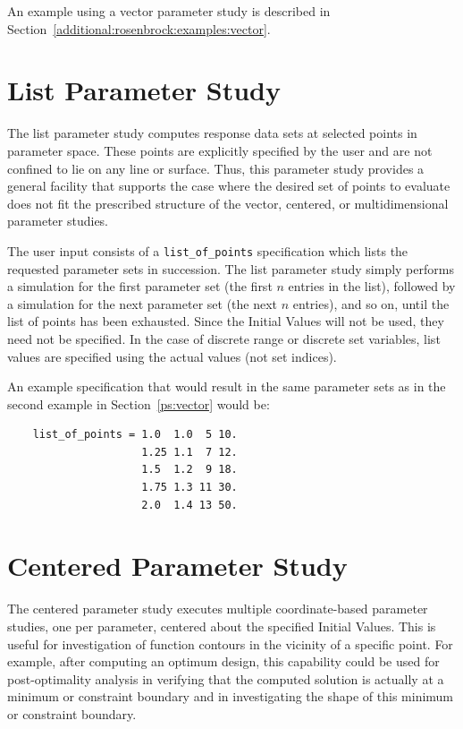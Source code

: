 An example using a vector parameter study is described in 
Section~\ref{additional:rosenbrock:examples:vector}.

\section{List Parameter Study}\label{ps:list}

The list parameter study computes response data sets at selected
points in parameter space. These points are explicitly specified by
the user and are not confined to lie on any line or surface. Thus,
this parameter study provides a general facility that supports the
case where the desired set of points to evaluate does not fit the
prescribed structure of the vector, centered, or multidimensional
parameter studies.

The user input consists of a \texttt{list\_of\_points} specification
which lists the requested parameter sets in succession. The list
parameter study simply performs a simulation for the first parameter
set (the first $n$ entries in the list), followed by a simulation for
the next parameter set (the next $n$ entries), and so on, until the
list of points has been exhausted. Since the Initial Values will not
be used, they need not be specified.  In the case of discrete range or
discrete set variables, list values are specified using the actual
values (not set indices).

An example specification that would result in the same parameter sets
as in the second example in Section~\ref{ps:vector} would be:
\begin{small}
\begin{verbatim}
    list_of_points = 1.0  1.0  5 10.
                     1.25 1.1  7 12.
                     1.5  1.2  9 18.
                     1.75 1.3 11 30.
                     2.0  1.4 13 50.
\end{verbatim}
\end{small}

\section{Centered Parameter Study}\label{ps:centered}

The centered parameter study executes multiple coordinate-based
parameter studies, one per parameter, centered about the specified
Initial Values. This is useful for investigation of function contours
in the vicinity of a specific point. For example, after computing an
optimum design, this capability could be used for post-optimality
analysis in verifying that the computed solution is actually at a
minimum or constraint boundary and in investigating the shape of this
minimum or constraint boundary.

